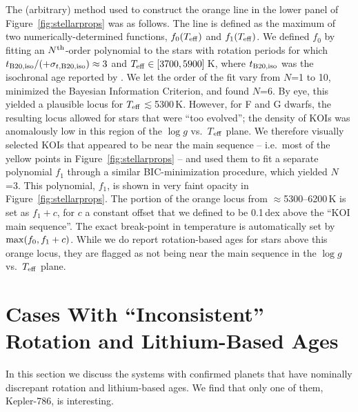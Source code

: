 \documentclass[11pt,twocolumn,tighten,linenumbers,trackchanges]{aastex63}
\begin{document}
The (arbitrary) method used to construct the orange line in 
the lower panel of Figure~\ref{fig:stellarprops} was as follows.
The line is	defined as
the maximum of two numerically-determined functions, $f_0(T_{\rm eff})$ and $f_1(T_{\rm eff})$.
We defined $f_0$ by fitting an
$N^{\rm th}$-order polynomial to the stars with rotation periods for which $t_{\rm
	B20,iso}/(+\sigma_{t,{\rm B20,iso}})\approx 3$
and $T_{\rm eff}\in[3700,5900]$\,K, where
$t_{\rm B20,iso}$ was the isochronal age reported by
\citet{Berger_2020a_catalog}.  We let the order of the fit vary from
$N$=1 to 10, minimized the Bayesian Information Criterion,
and found $N$=6.  
By eye, this yielded a plausible locus for $T_{\rm eff}$$\lesssim$5300\,K.
However, for F and G dwarfs, the resulting locus
allowed for stars that were ``too evolved''; the density of KOIs 
was anomalously low in this region of the $\log g$ vs.\ $T$$_{\rm eff}$ plane.
We therefore visually selected KOIs that appeared
to be near the main sequence -- i.e.~most of the yellow
points in Figure~\ref{fig:stellarprops} -- and used them to fit a separate
polynomial $f_1$ through a similar BIC-minimization procedure,
which yielded $N$=3.
This polynomial, $f_1$, is shown in very faint opacity in Figure~\ref{fig:stellarprops}.
The portion of the orange locus from $\approx$5300--6200\,K
is set as $f_1 + c$, for $c$ a constant offset that we defined to be
0.1\,dex above the ``KOI main sequence''.
The exact break-point in temperature is automatically set by ${\rm max}(f_0, f_1+c)$.
While we do report rotation-based ages for stars
above this orange locus,
they are flagged as not being near the main sequence in the $\log g$ vs.~$T_{\rm eff}$ plane. 


\section{Cases With ``Inconsistent'' Rotation and Lithium-Based Ages}
\label{app:inconsistent}

In this section we discuss the systems with confirmed planets that
have nominally discrepant rotation and lithium-based ages.  We find
that only one of them, Kepler-786, is interesting.
\end{document}
